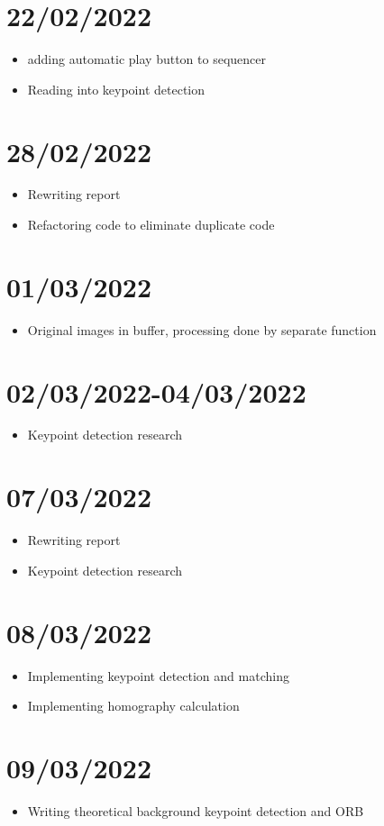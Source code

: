 \section{22/02/2022}
\begin{itemize}
    \item adding automatic play button to sequencer
    \item Reading into keypoint detection
\end{itemize}

\section{28/02/2022}
\begin{itemize}
    \item Rewriting report
    \item Refactoring code to eliminate duplicate code
\end{itemize}

\section{01/03/2022}
\begin{itemize}
    \item Original images in buffer, processing done by separate function
\end{itemize}

\section{02/03/2022-04/03/2022}
\begin{itemize}
    \item Keypoint detection research
\end{itemize}

\section{07/03/2022}
\begin{itemize}
    \item Rewriting report
    \item Keypoint detection research
\end{itemize}

\section{08/03/2022}
\begin{itemize}
    \item Implementing keypoint detection and matching
    \item Implementing homography calculation
\end{itemize}

\section{09/03/2022}
\begin{itemize}
    \item Writing theoretical background keypoint detection and ORB
\end{itemize}